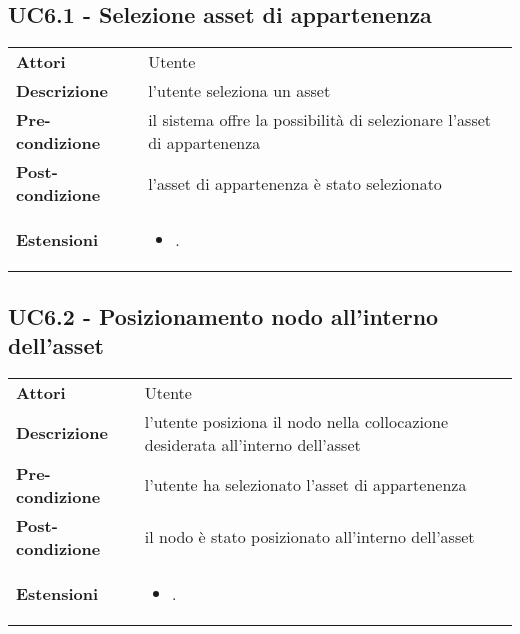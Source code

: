 \subsection{UC6.1 - Selezione asset di appartenenza}
\label{sssec:UC6.1}
\def\arraystretch{1.5}
\begin{tabularx}{\textwidth}{l|p{}}
\rowcolor{I} \multicolumn{2}{c}{\color{white}\textbf{UC6.1 - Selezione asset di appartenenza}} \\
\toprule
\endhead
\textbf{Attori} & Utente\\
\textbf{Descrizione} & l'utente seleziona un asset\\
\textbf{Pre-condizione} & il sistema offre la possibilità di selezionare l'asset di appartenenza\\
\textbf{Post-condizione} & l'asset di appartenenza è stato selezionato\\
\textbf{Estensioni} & \vspace{-1.2em}\begin{itemize}[leftmargin=*,noitemsep,nosep]
\item \nameref{sssec:UC6.5}.
\end{itemize}\\
\bottomrule
\end{tabularx}
\subsection{UC6.2 - Posizionamento nodo all'interno dell'asset}
\label{sssec:UC6.2}
\def\arraystretch{1.5}
\begin{tabularx}{\textwidth}{l|p{}}
\rowcolor{I} \multicolumn{2}{c}{\color{white}\textbf{UC6.2 - Posizionamento nodo all'interno dell'asset}} \\
\toprule
\endhead
\textbf{Attori} & Utente\\
\textbf{Descrizione} & l'utente posiziona il nodo nella collocazione desiderata all'interno dell'asset\\
\textbf{Pre-condizione} & l'utente ha selezionato l'asset di appartenenza\\
\textbf{Post-condizione} & il nodo è stato posizionato all'interno dell'asset\\
\textbf{Estensioni} & \vspace{-1.2em}\begin{itemize}[leftmargin=*,noitemsep,nosep]
\item \nameref{sssec:UC6.5}.
\end{itemize}\\
\bottomrule
\end{tabularx}
